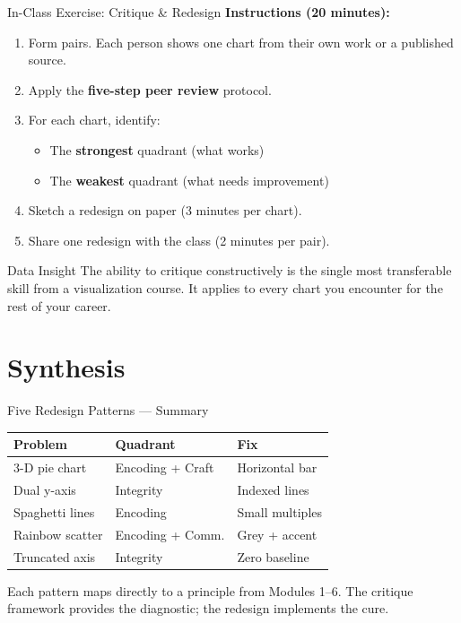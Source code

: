 \documentclass[10pt]{beamer}
\begin{document}
\begin{frame}{In-Class Exercise: Critique \& Redesign}
  \textbf{Instructions (20 minutes):}
  \begin{enumerate}
    \item Form pairs. Each person shows one chart from their own work
          or a published source.
    \item Apply the \textbf{five-step peer review} protocol.
    \item For each chart, identify:
          \begin{itemize}
            \item The \textbf{strongest} quadrant (what works)
            \item The \textbf{weakest} quadrant (what needs improvement)
          \end{itemize}
    \item Sketch a redesign on paper (3 minutes per chart).
    \item Share one redesign with the class (2 minutes per pair).
  \end{enumerate}

  \vspace{4pt}
  \begin{exampleblock}{Data Insight}
    The ability to critique constructively is the single most transferable
    skill from a visualization course. It applies to every chart you
    encounter for the rest of your career.
  \end{exampleblock}
\end{frame}

\section{Synthesis}

\begin{frame}{Five Redesign Patterns --- Summary}
  \centering
  \begin{tabular}{lll}
    \toprule
    \textbf{Problem} & \textbf{Quadrant} & \textbf{Fix} \\
    \midrule
    3-D pie chart       & Encoding + Craft & Horizontal bar \\
    Dual y-axis         & Integrity        & Indexed lines \\
    Spaghetti lines     & Encoding         & Small multiples \\
    Rainbow scatter     & Encoding + Comm. & Grey + accent \\
    Truncated axis      & Integrity        & Zero baseline \\
    \bottomrule
  \end{tabular}

  \vspace{8pt}
  Each pattern maps directly to a principle from Modules 1--6.
  The critique framework provides the diagnostic; the redesign
  implements the cure.
\end{frame}
\end{document}
